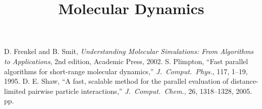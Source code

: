 \documentclass[11pt]{article}
\title{Molecular Dynamics}
\begin{document}
\maketitle



\begin{thebibliography}{9}
 D. Frenkel and B. Smit, {\em Understanding Molecular Simulations: From Algorithms to Applications}, 2nd edition, Academic Press, 2002.
 S. Plimpton, ``Fast parallel algorithms for short-range molecular dynamics,''
{\em J.\ Comput.\ Phys.}, 117, 1--19, 1995.
 D. E. Shaw, ``A fast, scalable method for the parallel evaluation of
distance-limited pairwise particle interactions,'' {\em J.\ Comput.\ Chem.}, 26, 1318--1328, 2005.
pp.
\end{thebibliography}
\end{document}
